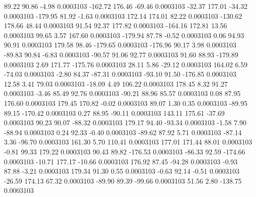        89.22       90.86       -4.98     0.0003103
     -162.72      176.46      -69.46     0.0003103
      -32.37      177.01      -34.32     0.0003103
     -179.95       81.92       -1.63     0.0003103
      172.14      174.01       82.22     0.0003103
     -130.62      178.66       48.44     0.0003103
       91.54       92.37      177.82     0.0003103
     -164.16      172.81       13.56     0.0003103
       99.65        3.57      167.60     0.0003103
     -179.94       87.78       -0.52     0.0003103
        0.06       94.93       90.91     0.0003103
      179.58       98.46     -179.65     0.0003103
     -176.96       90.17        3.98     0.0003103
      -89.83       90.84       -6.83     0.0003103
      -90.57       91.06       92.77     0.0003103
       91.60       88.93     -179.89     0.0003103
        2.69      171.77     -175.76     0.0003103
       28.11        5.86      -29.12     0.0003103
      164.02        6.59      -74.03     0.0003103
       -2.80       84.37      -87.31     0.0003103
      -93.10       91.50     -176.85     0.0003103
       12.58        3.41       79.03     0.0003103
      -18.09        4.49      106.22     0.0003103
      178.45        8.32       91.27     0.0003103
       -3.46       85.49       92.76     0.0003103
      -90.21       88.96       85.57     0.0003103
        0.08       87.95      176.60     0.0003103
      179.45      170.82       -0.02     0.0003103
       89.07        1.30        0.35     0.0003103
      -89.95       89.15     -170.42     0.0003103
        0.27       88.95      -90.11     0.0003103
      143.11      175.61      -37.69     0.0003103
       90.23       90.07      -88.32     0.0003103
      179.17       94.40      -93.34     0.0003103
       -1.58        7.90      -88.94     0.0003103
        0.24       92.33       -0.40     0.0003103
      -89.62       87.92        5.71     0.0003103
      -87.14        3.36      -96.70     0.0003103
      161.30        5.70      110.41     0.0003103
      177.01      171.44       88.01     0.0003103
       -0.81       99.33      179.22     0.0003103
       90.43       89.82     -176.53     0.0003103
      -86.33       92.59     -174.66     0.0003103
      -10.71      177.17      -10.66     0.0003103
      176.92       87.45      -94.28     0.0003103
       -0.93       87.88       -3.21     0.0003103
      179.34       91.30        0.55     0.0003103
       -0.63       92.14       -0.51     0.0003103
      -26.59      174.13       67.32     0.0003103
      -89.90       89.39      -99.66     0.0003103
       51.56        2.80     -138.75     0.0003103
